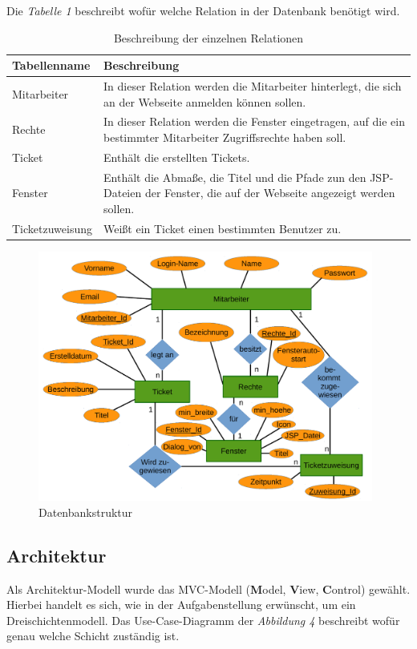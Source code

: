 \documentclass[12pt, a4paper]{article}
\begin{document}
Die \textit{Tabelle 1} beschreibt wofür welche Relation in der Datenbank benötigt wird.
\begin{table}[H]
	\begin{center}
		\begin{tabular}{|p{3cm}|p{10cm}|}
			\hline 
				\cellcolor{Hellgrau}Tabellenname & \cellcolor{Hellgrau}Beschreibung \\ 
			\hline 
				Mitarbeiter & In dieser Relation werden die Mitarbeiter hinterlegt, die sich an der Webseite anmelden können sollen.\\ 
			\hline
				Rechte & In dieser Relation werden die Fenster eingetragen, auf die ein bestimmter Mitarbeiter Zugriffsrechte haben soll.\\ 
			\hline
				Ticket & Enthält die erstellten Tickets.\\ 
			\hline
				Fenster & Enthält die Abmaße, die Titel und die Pfade zun den JSP-Dateien der Fenster, die auf der Webseite angezeigt werden sollen.\\ 
			\hline
				Ticketzuweisung & Weißt ein Ticket einen bestimmten Benutzer zu.\\ 
			\hline
		\end{tabular}
	\end{center}
	\caption{Beschreibung der einzelnen Relationen}
\end{table}

\begin{figure}[H]
	\begin{center}
		\includegraphics[width=110mm]{Bilder/erd.pdf}
	\end{center}
	\caption{Datenbankstruktur}
\end{figure}

\subsection{Architektur}
Als Architektur-Modell wurde das MVC-Modell (\textbf{M}odel, \textbf{V}iew, \textbf{C}ontrol) gewählt. Hierbei handelt es sich, wie in der Aufgabenstellung erwünscht, um ein Dreischichtenmodell. Das Use-Case-Diagramm der \textit{Abbildung 4} beschreibt wofür genau welche Schicht zuständig ist.
\end{document}
